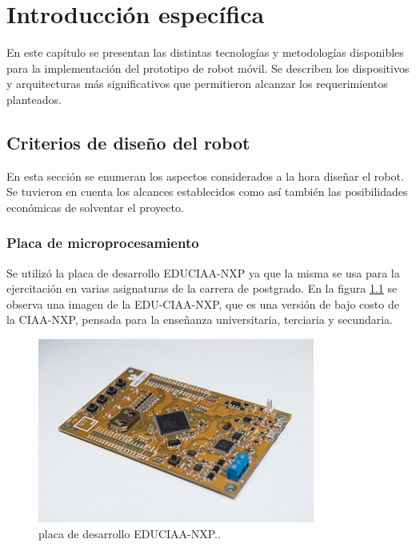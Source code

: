 \chapter{Introducción específica} %

\label{Chapter2}

En este capítulo se presentan las distintas tecnologías y metodologías disponibles para la implementación del prototipo de robot móvil. Se describen los dispositivos y arquitecturas más significativos que permitieron alcanzar los requerimientos planteados.

\section{Criterios de diseño del robot}

En esta sección se enumeran los aspectos considerados a la hora diseñar el robot. Se tuvieron en cuenta los alcances establecidos como así también las posibilidades económicas de solventar el proyecto. 



\subsection{Placa de microprocesamiento}
Se utilizó  la placa de desarrollo EDUCIAA-NXP \citep{EDUCIAA} ya que la misma se usa para la ejercitación en varias asignaturas de la carrera de postgrado. En la figura \ref{fig:EDUCIAANXP} se observa una imagen de la EDU-CIAA-NXP, que es una versión de bajo costo de la CIAA-NXP, pensada para la enseñanza universitaria, terciaria y secundaria. 

\begin{figure}[htpb]
	\centering
	\includegraphics[width=\textwidth]{./Figures/EDUCIAANXP.jpg}
	\caption{placa de desarrollo EDUCIAA-NXP.\protect\footnotemark.}
	\label{fig:EDUCIAANXP}
\end{figure}



